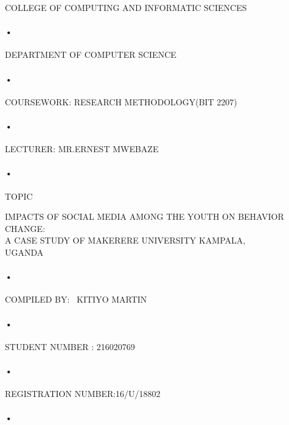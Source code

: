 \documentclass[12pt,A4paper]{article}
\begin{document}
\begin{titlepage}

  

\centerline{COLLEGE OF COMPUTING AND INFORMATIC SCIENCES}
\paragraph{•}
\centerline{DEPARTMENT OF COMPUTER SCIENCE\\}
\paragraph{•}

\centerline{COURSEWORK: RESEARCH METHODOLOGY(BIT 2207)\\}
\paragraph{•}

\centerline{LECTURER: MR.ERNEST MWEBAZE}
\paragraph{•}

\centerline{TOPIC\\}IMPACTS OF SOCIAL MEDIA AMONG THE YOUTH ON BEHAVIOR CHANGE: \\ A CASE STUDY OF MAKERERE UNIVERSITY KAMPALA,\\UGANDA  \\
\paragraph{•}
\centerline{COMPILED BY: \
 KITIYO MARTIN}
 \paragraph{•}
\centerline{STUDENT NUMBER : 216020769}
\paragraph{•}
\centerline{REGISTRATION NUMBER:16/U/18802}
\paragraph{•}
\end{titlepage}
\tableofcontents
\newpage
{}
\end{document}
